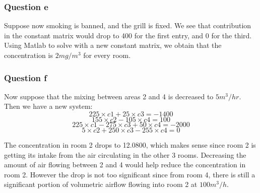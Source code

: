 \documentclass{article}
\begin{document}
    \subsubsection{Question e}
    Suppose now smoking is banned, and the grill is fixed. We see that  contribution in the constant matrix would drop to 400 for the first entry, and 0 for the third. Using Matlab to solve with a new constant matrix, we obtain that the concentration is ${2 mg/m^3}$ for every room.
    \subsubsection{Question f}
    Now suppose that the mixing between areas 2 and 4 is decreased to ${5m^3/hr}$. Then we have a new system:
    \[225{\times}c1 + 25{\times}c3 = -1400\]
	\[155{\times}c2 - 105{\times}c4 = 100\]
	\[225{\times}c1 - 275{\times}c3 + 50{\times}c4 = -2000\]
	\[5{\times}c2 + 250{\times}c3 - 255{\times}c4 = 0\]
	
	The concentration in room 2 drops to 12.0800, which makes sense since room 2 is getting its  intake from the air circulating in the other 3 rooms. Decreasing the amount of air flowing between 2 and 4 would help reduce the concentration in room 2. However the drop is not too significant since from room 4, there is still a significant portion of volumetric airflow flowing into room 2 at ${100m^3/h}$.
	
\end{document}
